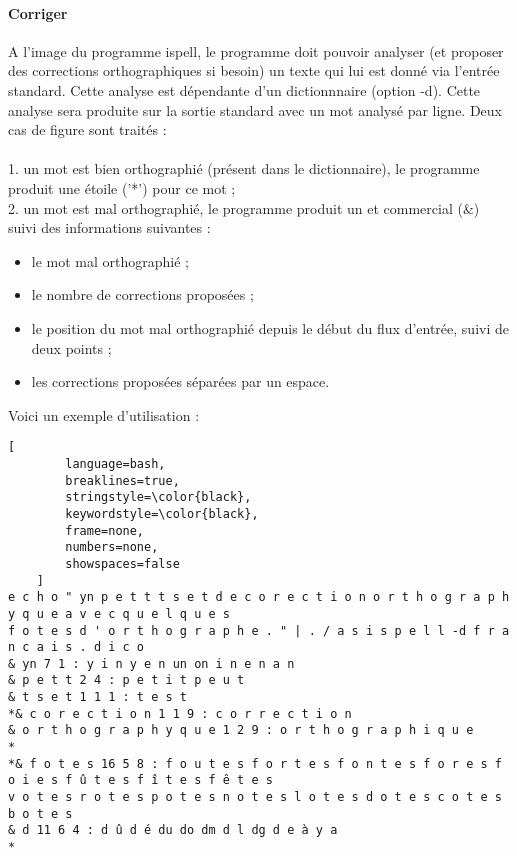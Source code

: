 \paragraph{Corriger}
A l'image du programme ispell, le programme doit pouvoir analyser (et proposer des corrections orthographiques si besoin) 
un texte qui lui est donné via l'entrée standard. Cette analyse est dépendante d'un dictionnnaire (option -d). 
Cette analyse sera produite sur la sortie standard avec un mot analysé par ligne. Deux cas de figure sont traités :\\
\\
1. un mot est bien orthographié (présent dans le dictionnaire), le programme produit une étoile ('*')
pour ce mot ;\\
2. un mot est mal orthographié, le programme produit un et commercial (\&) suivi des informations suivantes :
\begin{itemize}
	\item le mot mal orthographié ;
	\item le nombre de corrections proposées ;
	\item le position du mot mal orthographié depuis le début du flux d'entrée, suivi de deux points ;
	\item les corrections proposées séparées par un espace.
\end{itemize}
Voici un exemple d'utilisation :
\begin{lstlisting}[
		language=bash,
		breaklines=true,
		stringstyle=\color{black},
		keywordstyle=\color{black},
		frame=none,
		numbers=none,
		showspaces=false
	]
e c h o " yn p e t t t s e t d e c o r e c t i o n o r t h o g r a p h y q u e a v e c q u e l q u e s
f o t e s d ' o r t h o g r a p h e . " | . / a s i s p e l l -d f r a n c a i s . d i c o
& yn 7 1 : y i n y e n un on i n e n a n
& p e t t 2 4 : p e t i t p e u t
& t s e t 1 1 1 : t e s t
*& c o r e c t i o n 1 1 9 : c o r r e c t i o n
& o r t h o g r a p h y q u e 1 2 9 : o r t h o g r a p h i q u e
*
*& f o t e s 16 5 8 : f o u t e s f o r t e s f o n t e s f o r e s f o i e s f û t e s f î t e s f ê t e s
v o t e s r o t e s p o t e s n o t e s l o t e s d o t e s c o t e s b o t e s
& d 11 6 4 : d û d é du do dm d l dg d e à y a
*
\end{lstlisting}

